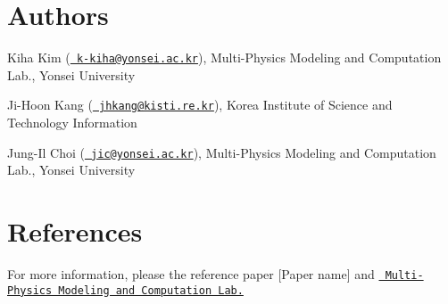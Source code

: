 \section*{Authors}


\begin{DoxyItemize}
\item Kiha Kim (\href{mailto:k-kiha@yonsei.ac.kr}{\texttt{ k-\/kiha@yonsei.\+ac.\+kr}}), Multi-\/\+Physics Modeling and Computation Lab., Yonsei University
\item Ji-\/\+Hoon Kang (\href{mailto:jhkang@kisti.re.kr}{\texttt{ jhkang@kisti.\+re.\+kr}}), Korea Institute of Science and Technology Information
\item Jung-\/\+Il Choi (\href{mailto:jic@yonsei.ac.kr}{\texttt{ jic@yonsei.\+ac.\+kr}}), Multi-\/\+Physics Modeling and Computation Lab., Yonsei University
\end{DoxyItemize}

\section*{References}

For more information, please the reference paper \mbox{[}Paper name\mbox{]} and \href{https://www.mpmc.yonsei.ac.kr/}{\texttt{ Multi-\/\+Physics Modeling and Computation Lab.}} 